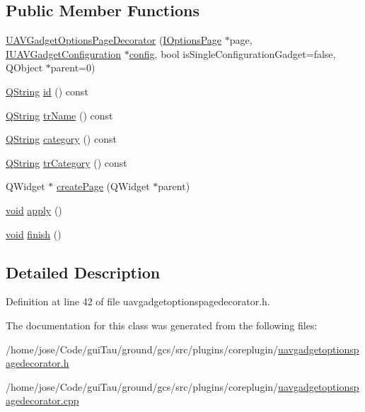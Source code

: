 \subsection*{Public Member Functions}
\begin{DoxyCompactItemize}
\item 
\hyperlink{group___core_plugin_gaf8ec05a3c48d283230164bdaf3c7a8fe}{U\-A\-V\-Gadget\-Options\-Page\-Decorator} (\hyperlink{class_core_1_1_i_options_page}{I\-Options\-Page} $\ast$page, \hyperlink{class_core_1_1_i_u_a_v_gadget_configuration}{I\-U\-A\-V\-Gadget\-Configuration} $\ast$\hyperlink{deflate_8c_a4473b5227787415097004fd39f55185e}{config}, bool is\-Single\-Configuration\-Gadget=false, Q\-Object $\ast$parent=0)
\item 
\hyperlink{group___u_a_v_objects_plugin_gab9d252f49c333c94a72f97ce3105a32d}{Q\-String} \hyperlink{group___core_plugin_ga7240cafa8bad2bf375cff77304850e8e}{id} () const 
\item 
\hyperlink{group___u_a_v_objects_plugin_gab9d252f49c333c94a72f97ce3105a32d}{Q\-String} \hyperlink{group___core_plugin_ga5b81ed9dcb5ba6fb5fdc2eb159691daa}{tr\-Name} () const 
\item 
\hyperlink{group___u_a_v_objects_plugin_gab9d252f49c333c94a72f97ce3105a32d}{Q\-String} \hyperlink{group___core_plugin_ga968cb1e30ffd33403e86e841b2cad4d3}{category} () const 
\item 
\hyperlink{group___u_a_v_objects_plugin_gab9d252f49c333c94a72f97ce3105a32d}{Q\-String} \hyperlink{group___core_plugin_ga3ef0a5ecd73cef99a1324885b89f4067}{tr\-Category} () const 
\item 
Q\-Widget $\ast$ \hyperlink{group___core_plugin_gab8804bee79b07efb8560f4b531b41097}{create\-Page} (Q\-Widget $\ast$parent)
\item 
\hyperlink{group___u_a_v_objects_plugin_ga444cf2ff3f0ecbe028adce838d373f5c}{void} \hyperlink{group___core_plugin_gaac8852aaf0ebbfa2adb09c436d7c5968}{apply} ()
\item 
\hyperlink{group___u_a_v_objects_plugin_ga444cf2ff3f0ecbe028adce838d373f5c}{void} \hyperlink{group___core_plugin_ga11f37f916e89f6d50487cf49dce75e4e}{finish} ()
\end{DoxyCompactItemize}


\subsection{Detailed Description}


Definition at line 42 of file uavgadgetoptionspagedecorator.\-h.



The documentation for this class was generated from the following files\-:\begin{DoxyCompactItemize}
\item 
/home/jose/\-Code/gui\-Tau/ground/gcs/src/plugins/coreplugin/\hyperlink{uavgadgetoptionspagedecorator_8h}{uavgadgetoptionspagedecorator.\-h}\item 
/home/jose/\-Code/gui\-Tau/ground/gcs/src/plugins/coreplugin/\hyperlink{uavgadgetoptionspagedecorator_8cpp}{uavgadgetoptionspagedecorator.\-cpp}\end{DoxyCompactItemize}
